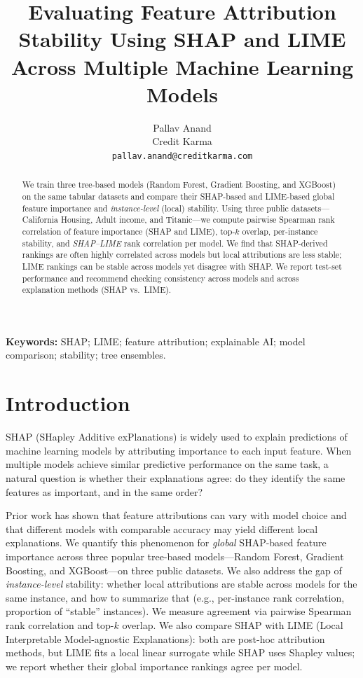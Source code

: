 \documentclass[11pt,a4paper]{article}
\title{Evaluating Feature Attribution Stability Using SHAP and LIME Across Multiple Machine Learning Models}
\author{
  Pallav Anand \\
  Credit Karma \\
  \texttt{pallav.anand@creditkarma.com}
}
\date{}
\begin{document}
\maketitle

\begin{abstract}
We train three tree-based models (Random Forest, Gradient Boosting, and XGBoost) on the same tabular datasets and compare their SHAP-based and LIME-based global feature importance and \emph{instance-level} (local) stability. Using three public datasets---California Housing, Adult income, and Titanic---we compute pairwise Spearman rank correlation of feature importance (SHAP and LIME), top-$k$ overlap, per-instance stability, and \emph{SHAP--LIME} rank correlation per model. We find that SHAP-derived rankings are often highly correlated across models but local attributions are less stable; LIME rankings can be stable across models yet disagree with SHAP. We report test-set performance and recommend checking consistency across models and across explanation methods (SHAP vs.\ LIME).
\end{abstract}

\noindent\textbf{Keywords:} SHAP; LIME; feature attribution; explainable AI; model comparison; stability; tree ensembles.

\section{Introduction}
\label{sec:intro}

SHAP (SHapley Additive exPlanations) is widely used to explain predictions of machine learning models by attributing importance to each input feature. When multiple models achieve similar predictive performance on the same task, a natural question is whether their explanations agree: do they identify the same features as important, and in the same order?

Prior work has shown that feature attributions can vary with model choice and that different models with comparable accuracy may yield different local explanations. We quantify this phenomenon for \emph{global} SHAP-based feature importance across three popular tree-based models---Random Forest, Gradient Boosting, and XGBoost---on three public datasets. We also address the gap of \emph{instance-level} stability: whether local attributions are stable across models for the same instance, and how to summarize that (e.g., per-instance rank correlation, proportion of ``stable'' instances). We measure agreement via pairwise Spearman rank correlation and top-$k$ overlap. We also compare SHAP with LIME (Local Interpretable Model-agnostic Explanations): both are post-hoc attribution methods, but LIME fits a local linear surrogate while SHAP uses Shapley values; we report whether their global importance rankings agree per model.
\end{document}
